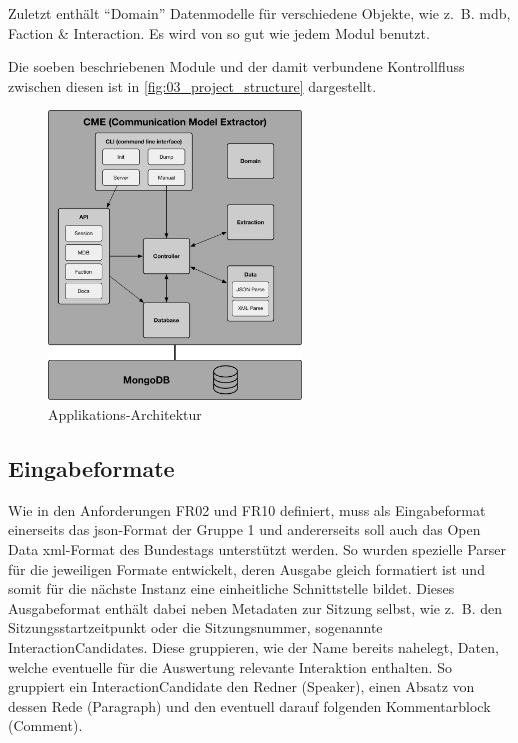 Zuletzt enthält \enquote{Domain} Datenmodelle für verschiedene Objekte, wie z.~B. \gls{mdb},
Faction \& Interaction. Es wird von so gut wie jedem Modul benutzt.

Die soeben beschriebenen Module und der damit verbundene Kontrollfluss zwischen
diesen ist in \autoref{fig:03_project_structure} dargestellt.

\begin{figure}[ht]
    \begin{center}
        \includegraphics[width=0.6\textwidth]{images/03-cme/Project-Modules.pdf}
    \end{center}
    \caption{Applikations-Architektur}
    \label{fig:03_project_structure}
\end{figure}

\subsection{Eingabeformate}
Wie in den Anforderungen FR02 und FR10 definiert, muss als Eingabeformat
einerseits das \gls{json}-Format der Gruppe 1 und andererseits soll auch das
Open Data \gls{xml}-Format des Bundestags unterstützt werden. So wurden
spezielle Parser für die jeweiligen Formate entwickelt, deren Ausgabe gleich
formatiert ist und somit für die nächste Instanz eine einheitliche
Schnittstelle bildet. Dieses Ausgabeformat enthält dabei neben Metadaten zur
Sitzung selbst, wie z.~B. den Sitzungsstartzeitpunkt oder die Sitzungsnummer,
sogenannte InteractionCandidates. Diese gruppieren, wie der Name bereits
nahelegt, Daten, welche eventuelle für die Auswertung relevante Interaktion
enthalten. So gruppiert ein InteractionCandidate den Redner (Speaker),
einen Absatz von dessen Rede (Paragraph) und den eventuell darauf folgenden
Kommentarblock (Comment).

